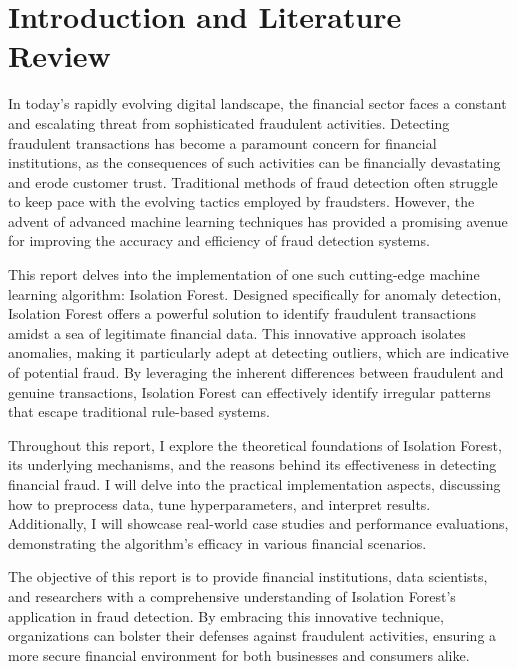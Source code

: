 \section{Introduction and Literature Review}
In today's rapidly evolving digital landscape, the financial sector faces a constant and escalating threat from sophisticated fraudulent activities. Detecting fraudulent transactions has become a paramount concern for financial institutions, as the consequences of such activities can be financially devastating and erode customer trust. Traditional methods of fraud detection often struggle to keep pace with the evolving tactics employed by fraudsters. However, the advent of advanced machine learning techniques has provided a promising avenue for improving the accuracy and efficiency of fraud detection systems.

This report delves into the implementation of one such cutting-edge machine learning algorithm: Isolation Forest. Designed specifically for anomaly detection, Isolation Forest offers a powerful solution to identify fraudulent transactions amidst a sea of legitimate financial data. This innovative approach isolates anomalies, making it particularly adept at detecting outliers, which are indicative of potential fraud. By leveraging the inherent differences between fraudulent and genuine transactions, Isolation Forest can effectively identify irregular patterns that escape traditional rule-based systems.

Throughout this report, I explore the theoretical foundations of Isolation Forest, its underlying mechanisms, and the reasons behind its effectiveness in detecting financial fraud. I will delve into the practical implementation aspects, discussing how to preprocess data, tune hyperparameters, and interpret results. Additionally, I will showcase real-world case studies and performance evaluations, demonstrating the algorithm's efficacy in various financial scenarios.

The objective of this report is to provide financial institutions, data scientists, and researchers with a comprehensive understanding of Isolation Forest's application in fraud detection. By embracing this innovative technique, organizations can bolster their defenses against fraudulent activities, ensuring a more secure financial environment for both businesses and consumers alike.
